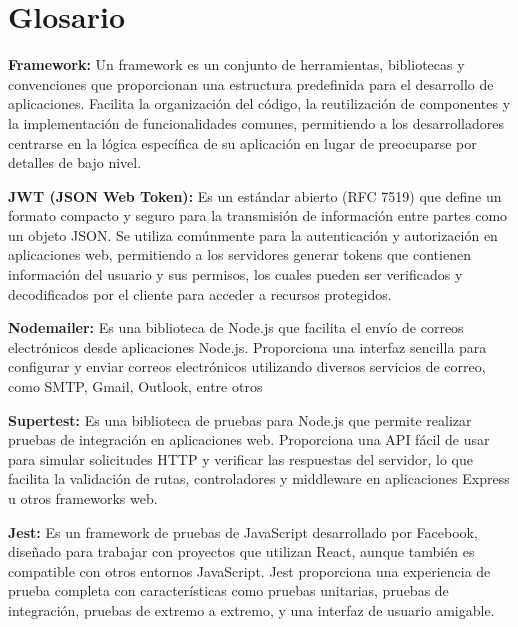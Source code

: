 \documentclass[12pt,letterpaper,oneside]{report}
\begin{document}
\chapter*{Glosario}

\begin{description}
  \item \textbf{Framework:} Un framework es un conjunto de herramientas, bibliotecas y convenciones que proporcionan una estructura predefinida para el desarrollo de aplicaciones. Facilita la organización del código, la reutilización de componentes y la implementación de funcionalidades comunes, permitiendo a los desarrolladores centrarse en la lógica específica de su aplicación en lugar de preocuparse por detalles de bajo nivel.

  \item \textbf{JWT (JSON Web Token):} Es un estándar abierto (RFC 7519) que define un formato compacto y seguro para la transmisión de información entre partes como un objeto JSON. Se utiliza comúnmente para la autenticación y autorización en aplicaciones web, permitiendo a los servidores generar tokens que contienen información del usuario y sus permisos, los cuales pueden ser verificados y decodificados por el cliente para acceder a recursos protegidos.

  \item \textbf{Nodemailer:} Es una biblioteca de Node.js que facilita el envío de correos electrónicos desde aplicaciones Node.js. Proporciona una interfaz sencilla para configurar y enviar correos electrónicos utilizando diversos servicios de correo, como SMTP, Gmail, Outlook, entre otros

  \item \textbf{Supertest:} Es una biblioteca de pruebas para Node.js que permite realizar pruebas de integración en aplicaciones web. Proporciona una API fácil de usar para simular solicitudes HTTP y verificar las respuestas del servidor, lo que facilita la validación de rutas, controladores y middleware en aplicaciones Express u otros frameworks web.

  \item \textbf{Jest:} Es un framework de pruebas de JavaScript desarrollado por Facebook, diseñado para trabajar con proyectos que utilizan React, aunque también es compatible con otros entornos JavaScript. Jest proporciona una experiencia de prueba completa con características como pruebas unitarias, pruebas de integración, pruebas de extremo a extremo, y una interfaz de usuario amigable.


\end{description}
\end{document}
